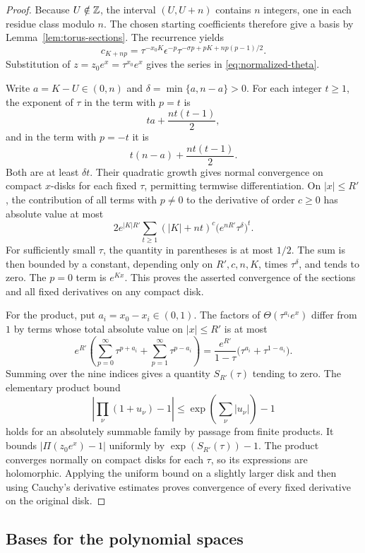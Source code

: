 \begin{proof}
Because $U\notin\mathbb Z$, the interval $(U,U+n)$ contains $n$ integers,
one in each residue class modulo $n$. The chosen starting
coefficients therefore give a basis by
Lemma~\ref{lem:torus-sections}. The recurrence yields
\[
 c_{K+np}=\tau^{-x_0K}\epsilon^{-p}
             \tau^{-\sigma p+pK+np(p-1)/2}.
\]
Substitution of $z=z_0e^x=\tau^{x_0}e^x$ gives the series in
\eqref{eq:normalized-theta}.

Write $a=K-U\in(0,n)$ and $\delta=\min\{a,n-a\}>0$.
For each integer $t\geq1$, the exponent of $\tau$ in the term
with $p=t$ is
\[
 ta+\frac{nt(t-1)}2,
\]
and in the term with $p=-t$ it is
\[
 t(n-a)+\frac{nt(t-1)}2.
\]
Both are at least $\delta t$. Their quadratic growth gives normal
convergence on compact $x$-disks for each fixed $\tau$, permitting
termwise differentiation. On $|x|\leq R'$, the contribution
of all terms with $p\neq0$ to the derivative of order $c\geq0$
has absolute value at most
\[
 2e^{|K|R'}\sum_{t\geq1}(|K|+nt)^c
              \bigl(e^{nR'}\tau^\delta\bigr)^t.
\]
For sufficiently small $\tau$, the quantity in parentheses is
at most $1/2$. The sum is then bounded by a constant, depending
only on $R',c,n,K$, times $\tau^\delta$, and tends to zero.
The $p=0$ term is $e^{Kx}$. This proves the asserted convergence
of the sections and all fixed derivatives on any compact disk.

For the product, put $a_i=x_0-x_i\in(0,1)$. The factors of
$\Theta(\tau^{a_i}e^x)$ differ from $1$ by terms whose total
absolute value on $|x|\leq R'$ is at most
\[
 e^{R'}\left(\sum_{p=0}^\infty\tau^{p+a_i}
                  +\sum_{p=1}^\infty\tau^{p-a_i}\right)
 =\frac{e^{R'}}{1-\tau}
                  \bigl(\tau^{a_i}+\tau^{1-a_i}\bigr).
\]
Summing over the nine indices gives a quantity $S_{R'}(\tau)$
tending to zero. The elementary product bound
\[
 \left|\prod_\nu(1+u_\nu)-1\right|
       \leq\exp\left(\sum_\nu|u_\nu|\right)-1
\]
holds for an absolutely summable family by passage from finite
products. It bounds $|\Pi(z_0e^x)-1|$ uniformly by
$\exp(S_{R'}(\tau))-1$. The product converges normally on
compact disks for each $\tau$, so its expressions are
holomorphic. Applying the uniform bound on a slightly larger
disk and then using Cauchy's derivative estimates proves
convergence of every fixed derivative on the original disk.
\end{proof}

\subsection{Bases for the polynomial spaces}

